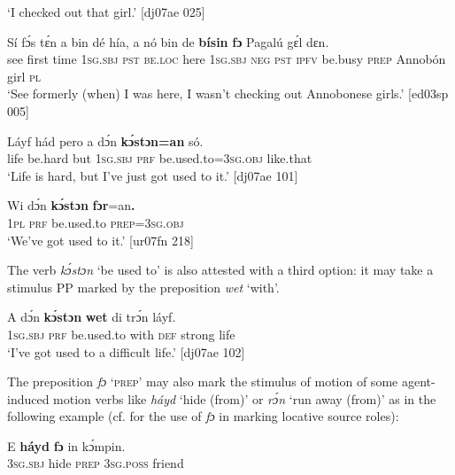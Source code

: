 \glt ‘I checked out that girl.’ [dj07ae 025]
\z


\ea%
    \label{ex:key:1053}
    \gll Sí  fɔ́s  tɛ́n    a    bin  dé    hía,    a    nó
bin  de  \textbf{bísin}  \textbf{fɔ}  Pagalú    gɛ́l  dɛn.\\
see  first  time    \textsc{1sg.sbj}  \textsc{pst}  \textsc{be.loc}  here    \textsc{1sg.sbj}  \textsc{neg}
\textsc{pst}  \textsc{ipfv}  be.busy  \textsc{prep}  Annobón    girl  \textsc{pl}\\

\glt ‘See formerly (when) I was here, I wasn’t checking out 
Annobonese girls.’ [ed03sp 005]
\z


\ea%
    \label{ex:key:1054}
    \gll Láyf    hád    pero  a    dɔ́n  \textbf{kɔ́stɔn=an}    só.\\
life    be.hard  but    \textsc{1sg.sbj}  \textsc{prf}  be.used.to=\textsc{3sg.obj}  like.that\\

\glt ‘Life is hard, but I’ve just got used to it.’ [dj07ae 101]
\z


\ea%
    \label{ex:key:1055}
    \gll Wi  dɔ́n \textbf{  kɔ́stɔn}    \textbf{fɔr}=an\textbf{.}\\
\textsc{1pl}  \textsc{prf}  be.used.to  \textsc{prep}=\textsc{3sg.obj}\\

\glt ‘We’ve got used to it.’ [ur07fn 218]
\z

The verb \textit{kɔ́stɔn} ‘be used to’ is also attested with a third option: it may take a stimulus PP marked by the preposition \textit{wet} ‘with’.


\ea%
    \label{ex:key:1056}
    \gll A    dɔ́n  \textbf{kɔ́stɔn}    \textbf{wet}    di  trɔ́n    láyf.\\
\textsc{1sg.sbj}  \textsc{prf}  be.used.to  with    \textsc{def}  strong  life\\

\glt ‘I’ve got used to a difficult life.’ [dj07ae 102]
\z

The preposition \textit{fɔ} ‘\textsc{prep}’ may also mark the stimulus of motion of some agent-induced motion verbs like \textit{háyd} ‘hide (from)’ or \textit{rɔ́n} ‘run away (from)’ as in the following example (cf.  for the use of \textit{fɔ} in marking locative source roles): 


\ea%
    \label{ex:key:1057}
    \gll E    \textbf{háyd}  \textbf{fɔ} in    kɔ́mpin.\\
\textsc{3sg.sbj}  hide    \textsc{prep}  \textsc{3sg.poss}  friend\\

